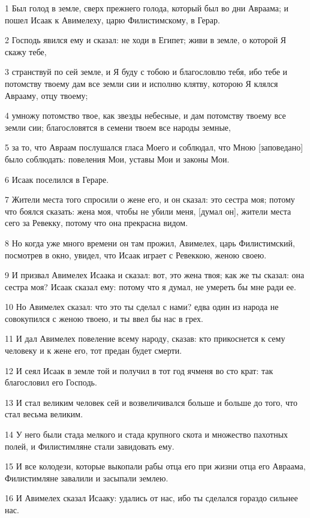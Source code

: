 \par 1 Был голод в земле, сверх прежнего голода, который был во дни Авраама; и пошел Исаак к Авимелеху, царю Филистимскому, в Герар.
\par 2 Господь явился ему и сказал: не ходи в Египет; живи в земле, о которой Я скажу тебе,
\par 3 странствуй по сей земле, и Я буду с тобою и благословлю тебя, ибо тебе и потомству твоему дам все земли сии и исполню клятву, которою Я клялся Аврааму, отцу твоему;
\par 4 умножу потомство твое, как звезды небесные, и дам потомству твоему все земли сии; благословятся в семени твоем все народы земные,
\par 5 за то, что Авраам послушался гласа Моего и соблюдал, что Мною [заповедано] было соблюдать: повеления Мои, уставы Мои и законы Мои.
\par 6 Исаак поселился в Гераре.
\par 7 Жители места того спросили о жене его, и он сказал: это сестра моя; потому что боялся сказать: жена моя, чтобы не убили меня, [думал он], жители места сего за Ревекку, потому что она прекрасна видом.
\par 8 Но когда уже много времени он там прожил, Авимелех, царь Филистимский, посмотрев в окно, увидел, что Исаак играет с Ревеккою, женою своею.
\par 9 И призвал Авимелех Исаака и сказал: вот, это жена твоя; как же ты сказал: она сестра моя? Исаак сказал ему: потому что я думал, не умереть бы мне ради ее.
\par 10 Но Авимелех сказал: что это ты сделал с нами? едва один из народа не совокупился с женою твоею, и ты ввел бы нас в грех.
\par 11 И дал Авимелех повеление всему народу, сказав: кто прикоснется к сему человеку и к жене его, тот предан будет смерти.
\par 12 И сеял Исаак в земле той и получил в тот год ячменя во сто крат: так благословил его Господь.
\par 13 И стал великим человек сей и возвеличивался больше и больше до того, что стал весьма великим.
\par 14 У него были стада мелкого и стада крупного скота и множество пахотных полей, и Филистимляне стали завидовать ему.
\par 15 И все колодези, которые выкопали рабы отца его при жизни отца его Авраама, Филистимляне завалили и засыпали землею.
\par 16 И Авимелех сказал Исааку: удались от нас, ибо ты сделался гораздо сильнее нас.
